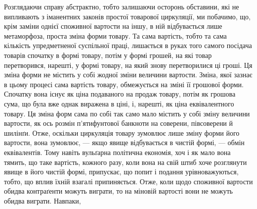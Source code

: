 Розглядаючи справу абстрактно, тобто залишаючи осторонь
обставини, які не випливають з іманентних законів простої товарової
циркуляції, ми побачимо, що, крім заміни однієї споживної
вартости на іншу, в ній відбувається лише метаморфоза, проста
зміна форми товару. Та сама вартість, тобто та сама кількість
упредметненої суспільної праці, лишається в руках того самого
посідача товарів спочатку в формі товару, потім у формі грошей,
на які товар перетворився, нарешті, у формі товару, на який
знову перетворилися ці гроші. Ця зміна форми не містить у собі
жодної зміни величини вартости. Зміна, якої зазнає в цьому процесі
сама вартість товару, обмежується на зміні її грошової
форми. Спочатку вона існує як ціна подаваного на продаж товару,
потім як грошова сума, що була вже однак виражена в ціні, і,
нарешті, як ціна еквівалентного товару. Ця зміна форм сама по
собі так само мало містить у собі зміну величини вартости, як
ось розмін п’ятифунтової банкноти на соверени, півсоверени й
шилінґи. Отже, оскільки циркуляція товару зумовлює лише
зміну форми його вартости, вона зумовлює, — якщо явище відбувається
в чистій формі, — обмін еквівалентів. Тому навіть вульґарна
політична економія, хоч і як мало вона тямить, що таке
вартість, кожного разу, коли вона на свій штиб хоче розглянути
явище в його чистій формі, припускає, що попит і подання урівноважуються,
тобто, що вплив їхній взагалі припиняється. Отже,
коли щодо споживної вартости обидва контраґенти можуть виграти,
то на міновій вартості вони не можуть обидва виграти. Навпаки,
\parbreak{}  %
